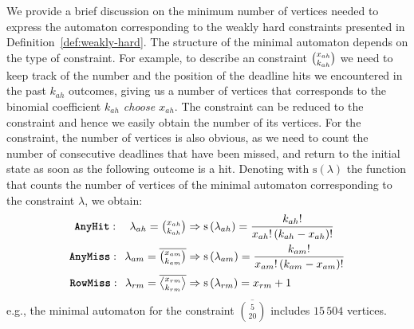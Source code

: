 We provide a brief discussion on the minimum number of vertices needed to express the automaton corresponding to the weakly hard constraints presented in Definition~\ref{def:weakly-hard}.
The structure of the minimal automaton depends on the type of constraint.
For example, to describe an \tAH{} constraint $\binom{x_{ah}}{k_{ah}}$ we need to keep track of the number and the position of the deadline hits we encountered in the past $k_{ah}$ outcomes, giving us a number of vertices that corresponds to the binomial coefficient \emph{$k_{ah}$ choose $x_{ah}$}.
The \tAM{} constraint can be reduced to the \tAH{} constraint and hence we easily obtain the number of its vertices.
For the \tRM{} constraint, the number of vertices is also obvious, as we need to count the number of consecutive deadlines that have been missed, and return to the initial state as soon as the following outcome is a hit.
Denoting with $\mathrm{s}\left(\lambda\right)$ the function that counts the number of vertices of the minimal automaton corresponding to the constraint $\lambda$, we obtain:
\begin{equation*}
    \begin{aligned}
        \tAH{}:\phantom{\textbf{iii}}\lambda_{ah} = \textstyle\anyhit{ah} & \Rightarrow \mathrm{s}\left(\lambda_{ah}\right) = \frac{k_{ah}!}{x_{ah}!\,(k_{ah}-x_{ah})!}  \\
        \tAM{}:\phantom{\textbf{s}}\lambda_{am} = \textstyle\anymiss{am} & \Rightarrow \mathrm{s}\left(\lambda_{am}\right) = \frac{k_{am}!}{x_{am}!\,(k_{am}-x_{am})!}  \\
        \tRM{}:\phantom{\textbf{s}}\lambda_{rm} = \textstyle\rowmiss{rm} & \Rightarrow \mathrm{s}\left(\lambda_{rm}\right) = x_{rm}+1 \\
    \end{aligned}
\end{equation*}
e.g., the minimal automaton for the \tAM{} constraint $\overline{\binom{5}{20}}$ includes $15\,504$ vertices.

